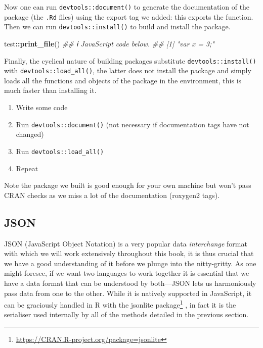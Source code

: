 \documentclass[
]{krantz}
\makeatletter
\newenvironment{Shaded}{\begin{snugshade}}{\end{snugshade}}
\newcommand{\CommentTok}[1]{\textcolor[rgb]{0.37,0.37,0.37}{\textit{#1}}}
\newcommand{\KeywordTok}[1]{\textcolor[rgb]{0.27,0.27,0.27}{\textbf{#1}}}
\newcommand{\NormalTok}[1]{#1}
\newcommand{\OperatorTok}[1]{\textcolor[rgb]{0.43,0.43,0.43}{\textbf{#1}}}
\providecommand{\tightlist}{%
  \setlength{\itemsep}{0pt}\setlength{\parskip}{0pt}}
\renewcommand{\href}[2]{#2\footnote{\url{#1}}}
\newenvironment{kframe}{%
\medskip{}
\setlength{\fboxsep}{.8em}
 \def\at@end@of@kframe{}%
 \ifinner\ifhmode%
  \def\at@end@of@kframe{\end{minipage}}%
  \begin{minipage}{\columnwidth}%
 \fi\fi%
 \def\FrameCommand##1{\hskip\@totalleftmargin \hskip-\fboxsep
 \colorbox{shadecolor}{##1}\hskip-\fboxsep
     \hskip-\linewidth \hskip-\@totalleftmargin \hskip\columnwidth}%
 \MakeFramed {\advance\hsize-\width
   \@totalleftmargin\z@ \linewidth\hsize
   \@setminipage}}%
 {\par\unskip\endMakeFramed%
 \at@end@of@kframe}
\renewenvironment{Shaded}{\begin{kframe}}{\end{kframe}}
\makeatother
\begin{document}
Now one can run \texttt{devtools::document()} to generate the documentation of the package (the \texttt{.Rd} files) using the export tag we added: this exports the function. Then we can run \texttt{devtools::install()} to build and install the package.

\begin{Shaded}
\begin{Highlighting}[]
\NormalTok{test}\OperatorTok{::}\KeywordTok{print\_file}\NormalTok{()}
\CommentTok{\#\# ℹ JavaScript code below.}
\CommentTok{\#\# [1] "var x = 3;"}
\end{Highlighting}
\end{Shaded}

Finally, the cyclical nature of building packages substitute \texttt{devtools::install()} with \texttt{devtools::load\_all()}, the latter does not install the package and simply loads all the functions and objects of the package in the environment, this is much faster than installing it.

\begin{enumerate}
\def\labelenumi{\arabic{enumi}.}
\tightlist
\item
  Write some code
\item
  Run \texttt{devtools::document()} (not necessary if documentation tags have not changed)
\item
  Run \texttt{devtools::load\_all()}
\item
  Repeat
\end{enumerate}

Note the package we built is good enough for your own machine but won't pass CRAN checks as we miss a lot of the documentation (roxygen2 tags).

\hypertarget{json}{%
\subsection*{JSON}\label{json}}


JSON (JavaScript Object Notation) is a very popular data \emph{interchange} format with which we will work extensively throughout this book, it is thus crucial that we have a good understanding of it before we plunge into the nitty-gritty. As one might foresee, if we want two languages to work together it is essential that we have a data format that can be understood by both---JSON lets us harmoniously pass data from one to the other. While it is natively supported in JavaScript, it can be graciously handled in R with the \href{https://CRAN.R-project.org/package=jsonlite}{jsonlite package} \citep{R-jsonlite}, in fact it is the serialiser used internally by all of the methods detailed in the previous section.
\end{document}
